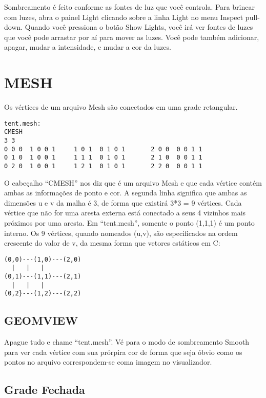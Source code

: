 \documentclass[12pt,a4paper]{book}
\begin{document}
Sombreamento \'e feito conforme as fontes de luz que voc\^e controla.
Para brincar com luzes, abra o painel Light clicando sobre a linha
Light no menu Inspect pull-down. Quando voc\^e pressiona o bot\~ao Show Lights,
voc\^e ir\'a ver fontes de luzes que voc\^e pode arrastar por a\'i para mover as luzes.
Voc\^e pode tamb\'em adicionar, apagar, mudar a intensidade, e mudar a
cor da luzes.

\chapter{MESH}

Os v\'ertices de um arquivo Mesh s\~ao conectados em uma grade retangular.

\begin{verbatim}
tent.mesh:
CMESH
3 3
0 0 0  1 0 0 1	   1 0 1  0 1 0 1	    2 0 0  0 0 1 1
0 1 0  1 0 0 1	   1 1 1  0 1 0 1	    2 1 0  0 0 1 1
0 2 0  1 0 0 1	   1 2 1  0 1 0 1	    2 2 0  0 0 1 1
\end{verbatim}

O cabe\c{c}alho ``CMESH'' nos diz que \'e um arquivo Mesh e que cada v\'ertice
cont\'em ambas as informa\c{c}\~oes de ponto e cor.  A segunda linha significa que
ambas as dimens\~oes u e v da malha \'e 3, de forma que existir\'a 3*3 =
9 v\'ertices. Cada v\'ertice que n\~ao for uma aresta externa est\'a conectado a
seus 4 vizinhos mais pr\'{o}ximos por uma aresta. Em ``tent.mesh'', somente o
ponto (1,1,1) \'e um ponto interno. Os 9 v\'ertices, quando nomeados (u,v),
s\~ao especificados na ordem crescente do valor de v, da mesma forma que vetores est\'aticos em C:

\begin{verbatim}
(0,0)---(1,0)---(2,0)   
  |	  |	  |
(0,1)---(1,1)---(2,1)
  |	  |	  |
(0,2}---(1,2)---(2,2)
\end{verbatim}

\section{GEOMVIEW}

Apague tudo e chame ``tent.mesh''. V\'e para o modo de sombreamento Smooth para
ver cada v\'ertice com sua pr\'{o}rpira cor de forma que seja \'{o}bvio como os pontos no
arquivo correspondem-se coma imagem no visualizador.

\section{Grade Fechada}
\end{document}
